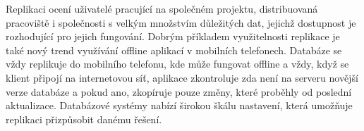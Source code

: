 Replikaci ocení uživatelé pracující na společném projektu, distribuovaná pracoviště i společnosti s velkým množstvím důležitých dat, jejichž dostupnost je rozhodující pro jejich fungování. Dobrým příkladem využitelnosti replikace je také nový trend využívání offline aplikací v mobilních telefonech. Databáze se vždy replikuje do mobilního telefonu, kde může fungovat offline a vždy, když se klient připojí na internetovou síť, aplikace zkontroluje zda není na serveru novější verze databáze a pokud ano, zkopíruje pouze změny, které proběhly od poslední aktualizace. Databázové systémy nabízí širokou škálu nastavení, která umožňuje replikaci přizpůsobit danému řešení.

